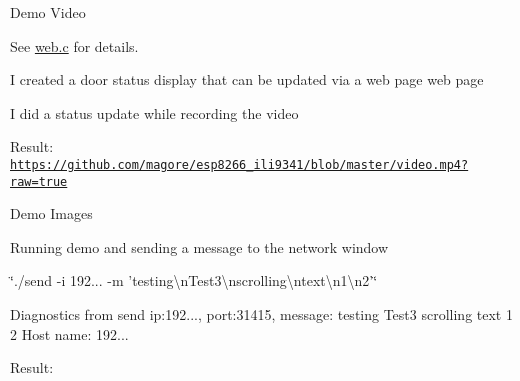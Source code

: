 \begin{DoxyParagraph}{Demo Video}

\begin{DoxyItemize}
\item See \hyperlink{web_8c}{web.\-c} for details.
\begin{DoxyItemize}
\item I created a door status display that can be updated via a web page web page
\item I did a status update while recording the video
\end{DoxyItemize}
\end{DoxyItemize}
\end{DoxyParagraph}

\begin{DoxyItemize}
\item Result\-: \href{https://github.com/magore/esp8266_ili9341/blob/master/video.mp4?raw=true}{\tt https\-://github.\-com/magore/esp8266\-\_\-ili9341/blob/master/video.\-mp4?raw=true}
\end{DoxyItemize}

\begin{DoxyParagraph}{Demo Images}

\begin{DoxyItemize}
\item Running demo and sending a message to the network window
\item \char`\"{}./send -\/i 192... -\/m 'testing\textbackslash{}n\-Test3\textbackslash{}nscrolling\textbackslash{}ntext\textbackslash{}n1\textbackslash{}n2'\char`\"{}
\begin{DoxyItemize}
\item Diagnostics from send ip\-:192..., port\-:31415, message\-: testing Test3 scrolling text 1 2 Host name\-: 192...
\item Result\-:  
\end{DoxyItemize}
\end{DoxyItemize}
\end{DoxyParagraph}
